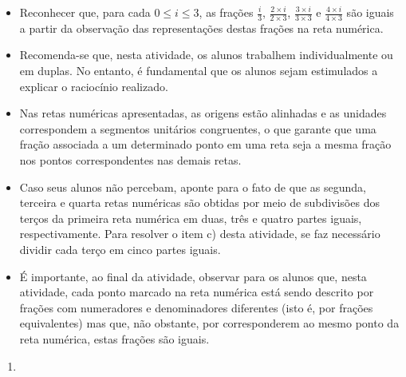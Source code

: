 \clearpage

\begin{atividade}\label{chap4-ativ7}
\objetivos
\begin{itemize} %
    \item       Reconhecer que, para cada       $0 \leq i \leq 3$, as frações
   $\frac{i}{3}$,       $\frac{2 \times i}{2 \times 3 }$,       $\frac{3 \times
i}{3 \times 3}$       e       $\frac{4 \times i}{4 \times 3}$       são iguais a
partir da observação das representações destas frações na reta numérica.
\end{itemize} %

\discussoes
\begin{itemize} %
    \item       Recomenda-se que, nesta atividade, os alunos trabalhem
individualmente ou em duplas. No entanto, é fundamental que os alunos sejam
estimulados a explicar o raciocínio realizado.
    \item       Nas retas numéricas apresentadas, as origens estão alinhadas e
as unidades correspondem a segmentos unitários congruentes, o que garante que
uma fração associada a um determinado ponto em uma reta seja a mesma fração nos
pontos correspondentes nas demais retas.
    \item       Caso seus alunos não percebam, aponte para o fato de que as
segunda, terceira e quarta retas numéricas são obtidas por meio de subdivisões
dos terços da primeira reta numérica em duas, três e quatro partes iguais,
respectivamente. Para resolver o item c) desta atividade, se faz necessário
dividir cada terço em cinco partes iguais.
    \item       É importante, ao final da atividade, observar para os alunos
que, nesta atividade, cada ponto marcado na reta numérica está sendo descrito
por frações com numeradores e denominadores diferentes (isto é, por frações
equivalentes) mas que, não obstante, por corresponderem ao mesmo ponto da reta
numérica, estas frações são iguais.
\end{itemize} %

\solucao

\begin{enumerate}
\item {}
{
}
\end{enumerate}
\end{atividade}
